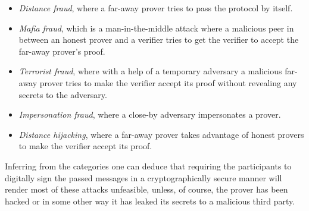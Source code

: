 \begin{itemize}
  \item \emph{Distance fraud}, where a far-away prover tries to pass the protocol by itself.
  \item \emph{Mafia fraud}, which is a man-in-the-middle attack where a malicious peer in between an honest prover and a verifier tries to get the verifier to accept the far-away prover's proof.
  \item \emph{Terrorist fraud}, where with a help of a temporary adversary a malicious far-away prover tries to make the verifier accept its proof without revealing any secrets to the adversary.
  \item \emph{Impersonation fraud}, where a close-by adversary impersonates a prover.
  \item \emph{Distance hijacking}, where a far-away prover takes advantage of honest provers to make the verifier accept its proof.
\end{itemize}

Inferring from the categories one can deduce that requiring the participants to digitally sign the passed messages in a cryptographically secure manner will render most of these attacks unfeasible, unless, of course, the prover has been hacked or in some other way it has leaked its secrets to a malicious third party.
